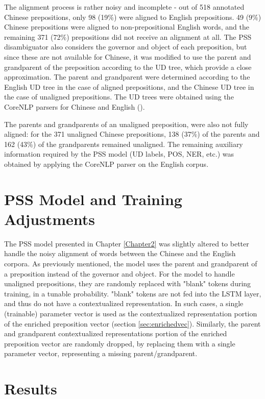 The alignment process is rather noisy and incomplete - out of 518 annotated Chinese prepositions, only 98 (19\%) were aligned to English prepositions. 49 (9\%) Chinese prepositions were aligned to non-prepositional English words, and the remaining 371 (72\%) prepositions did not receive an alignment at all. The PSS disambiguator also considers the governor and object of each preposition, but since these are not available for Chinese, it was modified to use the parent and grandparent of the preposition according to the UD tree, which provide a close approximation. The parent and grandparent were determined according to the English UD tree in the case of aligned prepositions, and the Chinese UD tree in the case of unaligned prepositions. The UD trees were obtained using the CoreNLP parsers for Chinese and English (\cite{manning14stanford}). 

The parents and grandparents of an unaligned preposition, were also not fully aligned: for the 371 unaligned Chinese prepositions, 138 (37\%) of the parents and 162 (43\%) of the grandparents remained unaligned. The remaining auxiliary information required by the PSS model (UD labels, POS, NER, etc.) was obtained by applying the CoreNLP parser on the English corpus. 

\section{PSS Model and Training Adjustments} \label{sec:pssmodelmod}

The PSS model presented in Chapter \ref{Chapter2} was slightly altered to better handle the noisy alignment of words between the Chinese and the English corpora. As previously mentioned, the model uses the parent and grandparent of a preposition instead of the governor and object. For the model to handle unaligned prepositions, they are randomly replaced with "blank" tokens during training, in a tunable probability. "blank" tokens are not fed into the LSTM layer, and thus do not have a contextualized representation. In such cases, a single (trainable) parameter vector is used as the contextualized representation portion of the enriched preposition vector (section \ref{sec:enrichedvec}). Similarly, the parent and grandparent contextualized representations portion of the enriched preposition vector are randomly dropped, by replacing them with a single parameter vector, representing a missing parent/grandparent. 

\section{Results} \label{sec:zhpssres}

